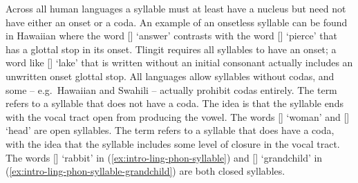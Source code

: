 \ex\label{ex:intro-ling-phon-syllable-grandchild}%
%
\xe

Across all human languages a syllable must at least have a nucleus but need not have either an onset or a coda. An example of an onsetless syllable can be found in Hawaiian where the word  [] ‘answer’ contrasts with the word  [] ‘pierce’ that has a glottal stop in its onset. Tlingit requires all syllables to have an onset; a word like  [] ‘lake’ that is written without an initial consonant actually includes an unwritten onset glottal stop. All languages allow syllables without codas, and some – e.g.\ Hawaiian and Swahili – actually prohibit codas entirely. The term  refers to a syllable that does not have a coda. The idea is that the syllable ends with the vocal tract open from producing the vowel. The words  [] ‘woman’ and  [] ‘head’ are open syllables. The term  refers to a syllable that does have a coda, with the idea that the syllable includes some level of closure in the vocal tract. The words  [] ‘rabbit’ in (\ref{ex:intro-ling-phon-syllable}) and  [] ‘grandchild’ in (\ref{ex:intro-ling-phon-syllable-grandchild}) are both closed syllables.

